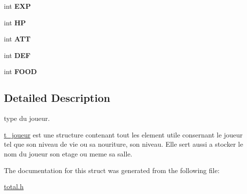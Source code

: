 \begin{DoxyCompactItemize}
\item 
int {\bfseries E\+XP}\hypertarget{structt__joueur_ad1e277dbbb6e308a4ed6047b051cd184}{}\label{structt__joueur_ad1e277dbbb6e308a4ed6047b051cd184}

\item 
int {\bfseries HP}\hypertarget{structt__joueur_a152d91e6a9d741b2914f06997c0044f9}{}\label{structt__joueur_a152d91e6a9d741b2914f06997c0044f9}

\item 
int {\bfseries A\+TT}\hypertarget{structt__joueur_ac4f5b3473792a52bac1d64a3f4f2b7e9}{}\label{structt__joueur_ac4f5b3473792a52bac1d64a3f4f2b7e9}

\item 
int {\bfseries D\+EF}\hypertarget{structt__joueur_a14432729537b37583c49fb38896d8f99}{}\label{structt__joueur_a14432729537b37583c49fb38896d8f99}

\item 
int {\bfseries F\+O\+OD}\hypertarget{structt__joueur_ac2643fd79fbfc94efaa7ae6d989b3ca3}{}\label{structt__joueur_ac2643fd79fbfc94efaa7ae6d989b3ca3}

\end{DoxyCompactItemize}


\subsection{Detailed Description}
type du joueur. 

\hyperlink{structt__joueur}{t\+\_\+joueur} est une structure contenant tout les element utile consernant le joueur tel que son niveau de vie ou sa nouriture, son niveau. Elle sert aussi a stocker le nom du joueur son etage ou meme sa salle. 

The documentation for this struct was generated from the following file\+:\begin{DoxyCompactItemize}
\item 
\hyperlink{total_8h}{total.\+h}\end{DoxyCompactItemize}
